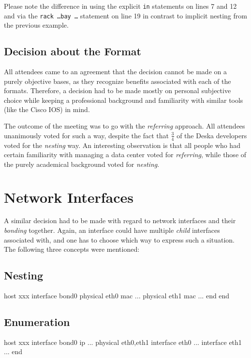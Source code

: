 \documentclass[12pt]{article}
\begin{document}
Please note the difference in using the explicit {\tt in} statements on lines 7
and 12 and via the {\tt rack \ldots bay \ldots} statement on line 19 in contrast
to implicit nesting from the previous example.

\subsection{Decision about the Format}

All attendees came to an agreement that the decision cannot be made on a purely
objective bases, as they recognize benefits associated with each of the formats.
Therefore, a decision had to be made mostly on personal subjective choice while
keeping a professional background and familiarity with similar tools (like the
Cisco IOS) in mind.

The outcome of the meeting was to go with the {\em referring} approach.  All
attendees unanimously voted for such a way, despite the fact that $\frac{3}{4}$
of the Deska developers voted for the {\em nesting} way.  An interesting
observation is that all people who had certain familiarity with managing a data
center voted for {\em referring}, while those of the purely academical
background voted for {\em nesting}.

\section{Network Interfaces}

A similar decision had to be made with regard to network interfaces and their
{\em bonding} together.  Again, an interface could have multiple {\em child}
interfaces associated with, and one has to choose which way to express such
a situation.  The following three concepts were mentioned:

\subsection{Nesting}
\begin{listing}{1}
host xxx
    interface bond0
        physical eth0 mac ...
        physical eth1 mac ...
    end
end
\end{listing}

\subsection{Enumeration}
\begin{listing}{1}
host xxx
    interface bond0 ip ... physical eth0,eth1
    interface eth0 ...
    interface eth1 ...
end
\end{listing}
\end{document}

